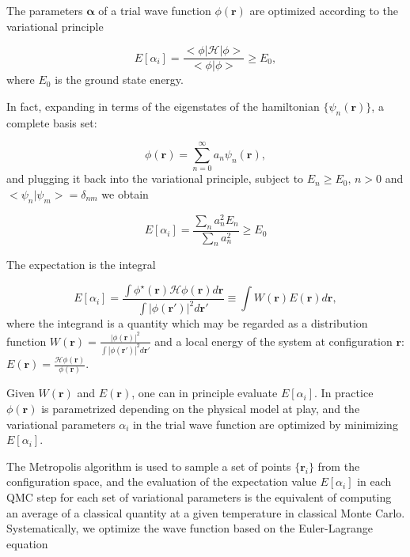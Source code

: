 \documentclass[10pt, twocolumn, twoside]{article}
\begin{document}
The parameters $\bm \alpha$ of a trial wave function $\phi(\bm r)$ are optimized according to the variational principle

\begin{equation}
E[\alpha_i] = \frac{< \phi | \mathcal{H} | \phi >}{<\phi | \phi>} \ge E_0,
\end{equation}
where $E_0$ is the ground state energy.

In fact, expanding in terms of the eigenstates of the hamiltonian $\{ \psi_n (\bm r) \}$, a complete basis set:

\begin{equation}
\phi (\bm r) = \sum_{n= 0}^{\infty} a_n \psi_n (\bm r) ,
\end{equation}
and plugging it back into the variational principle, subject to $E_n \ge E_0 ,\, n > 0$ and $<\psi_n | \psi_m> = \delta_{nm}$ we obtain

\begin{equation}
E[\alpha_i] = \frac{\sum_n a_n^2 E_n}{\sum_n a_n^2 } \ge E_0
\end{equation}

The expectation is the integral

\begin{equation}
E[\alpha_i] = \frac{\int \phi^\star (\bm r) \mathcal{H} \phi (\bm r) d\bm r}{\int | \phi (\bm r') |^2 d\bm r'} \equiv \int W(\bm r) E(\bm r) d\bm r ,
\end{equation}
where the integrand is a quantity which may be regarded as a distribution function $W(\bm r) = \frac{|\phi (\bm r)|^2}{\int |\phi(\bm r')|^2 d\bm r'}$ and a local energy of the system at configuration $\bm r$: $E(\bm r) = \frac{\mathcal{H}\phi(\bm r)}{\phi (\bm r)}$.

Given $W(\bm r)$ and $E(\bm r)$, one can in principle evaluate $E[\alpha_i]$. In practice $\phi (\bm r) $ is parametrized depending on the physical model at play, and the variational parameters $\alpha_i$ in the trial wave function are optimized by minimizing $E[\alpha_i]$.\par

The Metropolis algorithm is used to sample a set of points $\{\bm r_i\}$ from the configuration space, and the evaluation of the expectation value $E[\alpha_i]$ in each QMC step for each set of variational parameters is the equivalent of computing an average of a classical quantity at a given temperature in classical Monte Carlo. Systematically, we optimize the wave function based on the Euler-Lagrange equation
\end{document}
